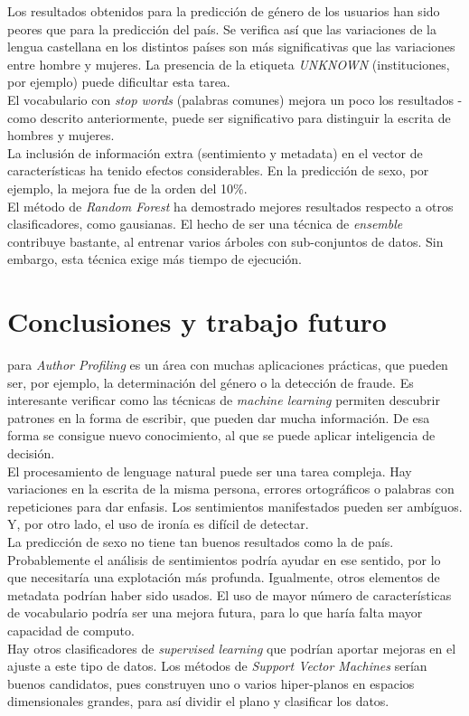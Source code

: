 \documentclass[11pt,a4paper]{article}
\begin{document}
  
  \indent Los resultados obtenidos para la predicci\'on de g\'enero de los usuarios han sido peores que para la predicci\'on del pa\'is. Se verifica as\'i que las variaciones de la lengua castellana en los distintos pa\'ises son m\'as significativas que las variaciones entre hombre y mujeres. La presencia de la etiqueta {\em UNKNOWN} (instituciones, por ejemplo) puede dificultar esta tarea. \\
  \indent El vocabulario con {\em stop words} (palabras comunes) mejora un poco los resultados - como descrito anteriormente, puede ser significativo para distinguir la escrita de hombres y mujeres. \\
  \indent La inclusi\'on de informaci\'on extra (sentimiento y metadata) en el vector de caracter\'isticas ha tenido efectos considerables. En la predicci\'on de sexo, por ejemplo, la mejora fue de la orden del 10\%. \\
  \indent El m\'etodo de {\em Random Forest} ha demostrado mejores resultados respecto a otros clasificadores, como gausianas. El hecho de ser una t\'ecnica de {\em ensemble} contribuye bastante, al entrenar varios \'arboles con sub-conjuntos de datos. Sin embargo, esta t\'ecnica exige m\'as tiempo de ejecuci\'on.\\


\section{Conclusiones y trabajo futuro}
  
   para {\em Author Profiling} es un \'area con muchas aplicaciones pr\'acticas, que pueden ser, por ejemplo, la determinaci\'on del g\'enero o la detecci\'on de fraude. Es interesante verificar como las t\'ecnicas de {\em machine learning} permiten descubrir patrones en la forma de escribir, que pueden dar mucha informaci\'on. De esa forma se consigue nuevo conocimiento, al que se puede aplicar inteligencia de decisi\'on.\\
  \indent El procesamiento de lenguage natural puede ser una tarea compleja. Hay variaciones en la escrita de la misma persona, errores ortogr\'aficos o palabras con repeticiones para dar enfasis. Los sentimientos manifestados pueden ser amb\'iguos. Y, por otro lado, el uso de iron\'ia es dif\'icil de detectar.\\
  \indent La predicci\'on de sexo no tiene tan buenos resultados como la de pa\'is. Probablemente el an\'alisis de sentimientos podr\'ia ayudar en ese sentido, por lo que necesitar\'ia una explotaci\'on m\'as profunda. Igualmente, otros elementos de metadata podr\'ian haber sido usados.
  \indent El uso de mayor n\'umero de caracter\'isticas de vocabulario podr\'ia ser una mejora futura, para lo que har\'ia falta mayor capacidad de computo.\\
  \indent Hay otros clasificadores de {\em supervised learning} que podr\'ian aportar mejoras en el ajuste a este tipo de datos. Los m\'etodos de {\em Support Vector Machines} ser\'ian buenos candidatos, pues construyen uno o varios hiper-planos en espacios dimensionales grandes, para as\'i dividir el plano y clasificar los datos. 
\end{document}
